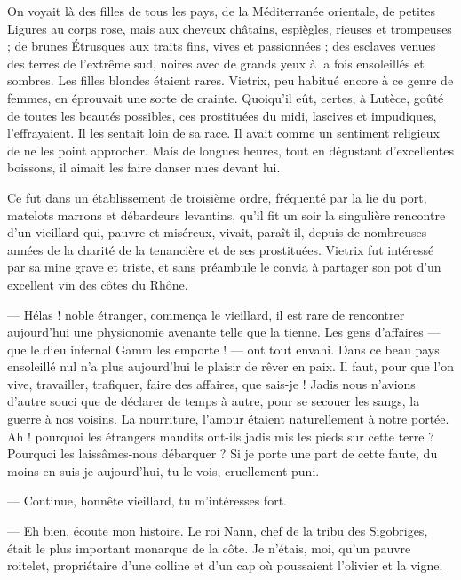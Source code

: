\documentclass[a4paper, 11pt, oneside, polutonikogreek, french]{article}
\begin{document}
On voyait là des filles de tous les pays, de la Méditerranée orientale, de petites Ligures au corps rose, mais aux cheveux châtains, espiègles, rieuses et trompeuses ; de brunes Étrusques aux traits fins, vives et passionnées ; des esclaves venues des terres de l'extrême sud, noires avec de grands yeux à la fois ensoleillés et sombres. Les filles blondes étaient rares. Vietrix, peu habitué encore à ce genre de femmes, en éprouvait une sorte de crainte. Quoiqu'il eût, certes, à Lutèce, goûté de toutes les beautés possibles, ces prostituées du midi, lascives et impudiques, l'effrayaient. Il les sentait loin de sa race. Il avait comme un sentiment religieux de ne les point approcher. Mais de longues heures, tout en dégustant d'excellentes boissons, il aimait les faire danser nues devant lui.

Ce fut dans un établissement de troisième ordre, fréquenté par la lie du port, matelots marrons et débardeurs levantins, qu'il fit un soir la singulière rencontre d'un vieillard qui, pauvre et miséreux, vivait, paraît-il, depuis de nombreuses années de la charité de la tenancière et de ses prostituées. Vietrix fut intéressé par sa mine grave et triste, et sans préambule le convia à partager son pot d'un excellent vin des côtes du Rhône.

\bigskip
\centerline{\EightStarTaper}
\centerline{\EightStarTaper\EightStarTaper}
\bigskip

--- Hélas ! noble étranger, commença le vieillard, il est rare de rencontrer aujourd'hui une physionomie avenante telle que la tienne. Les gens d'affaires --- que le dieu infernal Gamm les emporte ! --- ont tout envahi. Dans ce beau pays ensoleillé nul n'a plus aujourd'hui le plaisir de rêver en paix. Il faut, pour que l'on vive, travailler, trafiquer, faire des affaires, que sais-je ! Jadis nous n'avions d'autre souci que de déclarer de temps à autre, pour se secouer les sangs, la guerre à nos voisins. La nourriture, l'amour étaient naturellement à notre portée. Ah ! pourquoi les étrangers maudits ont-ils jadis mis les pieds sur cette terre ? Pourquoi les laissâmes-nous débarquer ? Si je porte une part de cette faute, du moins en suis-je aujourd'hui, tu le vois, cruellement puni.

--- Continue, honnête vieillard, tu m'intéresses fort.

--- Eh bien, écoute mon histoire. Le roi Nann, chef de la tribu des Sigobriges, était le plus important monarque de la côte. Je n'étais, moi, qu'un pauvre roitelet, propriétaire d'une colline et d'un cap où poussaient l'olivier et la vigne.
\end{document}
